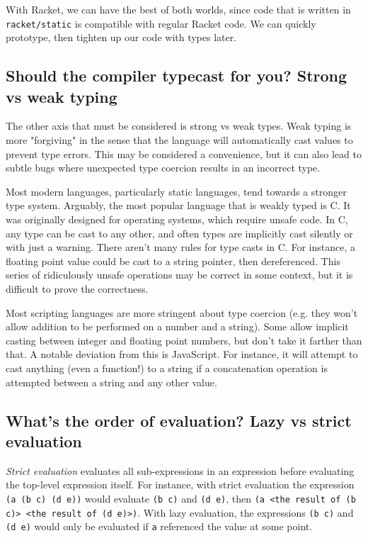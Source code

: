 \documentclass{book}
\newcommand{\Scribtexttt}[1]{{\texttt{#1}}}
\newcommand{\Stttextmore}{{\fontencoding{T1}\selectfont>}}
\newcommand{\Stttextless}{{\fontencoding{T1}\selectfont<}}
\newcommand{\Ssubsubsection}[2]{\subsubsection[#1]{#2}}
\renewcommand{\Ssubsubsection}[2]{\subsection[#1]{#2}}
\begin{document}
With Racket, we can have the best of both worlds, since code that is
written in \Scribtexttt{racket/static} is compatible with regular Racket code. We
can quickly prototype, then tighten up our code with types later.

\Ssubsubsection{Should the compiler typecast for you? Strong vs weak
typing}{Should the compiler typecast for you? Strong vs weak
typing}\label{t:x28part_x22Shouldx5fthex5fcompilerx5ftypecastx5fforx5fyoux5fx5fStrongx5fvsx5fweakx5ftypingx22x29}

The other axis that must be considered is strong vs weak types. Weak
typing is more "forgiving" in the sense that the language will
automatically cast values to prevent type errors. This may be considered
a convenience, but it can also lead to subtle bugs where unexpected type
coercion results in an incorrect type.

Most modern languages, particularly static languages, tend towards
a stronger type system. Arguably, the most popular language that is weakly
typed is C. It was originally designed for operating systems, which
require unsafe code. In C, any type can be cast to any other, and often
types are implicitly cast silently or with just a warning. There aren{'}t
many rules for type casts in C. For instance, a floating point value could
be cast to a string pointer, then dereferenced. This series of
ridiculously unsafe operations may be correct in some context, but it is
difficult to prove the correctness.

Most scripting languages are more stringent about type coercion (e.g. they
won{'}t allow addition to be performed on a number and a string). Some allow
implicit casting between integer and floating point numbers, but don{'}t
take it farther than that. A notable deviation from this is
JavaScript. For instance, it will attempt to cast anything (even a function!)
to a string if a concatenation operation is attempted between a string and
any other value.

\Ssubsubsection{What{'}s the order of evaluation? Lazy vs strict evaluation}{What{'}s the order of evaluation? Lazy vs strict evaluation}\label{t:x28part_x22Whatx5fsx5fthex5forderx5fofx5fevaluationx5fx5fLazyx5fvsx5fstrictx5fevaluationx22x29}

\textit{Strict evaluation} evaluates all sub{-}expressions in an expression
before evaluating the top{-}level expression itself. For instance, with
strict evaluation the expression \Scribtexttt{(a (b c) (d e))} would evaluate
\Scribtexttt{(b c)} and \Scribtexttt{(d e)}, then \Scribtexttt{(a {\Stttextless}the result of (b c){\Stttextmore} {\Stttextless}the result of (d e){\Stttextmore})}.
With lazy evaluation, the expressions \Scribtexttt{(b c)} and \Scribtexttt{(d e)} would only
be evaluated if \Scribtexttt{a} referenced the value at some point.
\end{document}
